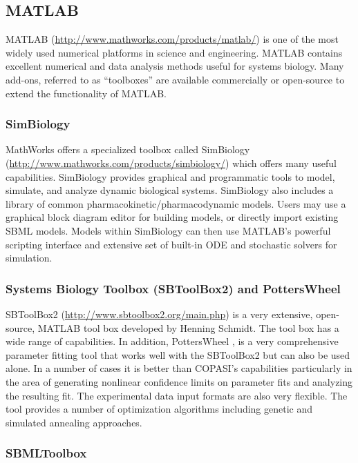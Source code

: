 \subsection{MATLAB}

MATLAB (\url{http://www.mathworks.com/products/matlab/}) is one of the
most widely used numerical platforms in science and engineering. MATLAB
contains excellent numerical and data analysis methods useful for
systems biology. Many add-ons, referred to as ``toolboxes'' are
available commercially or open-source to extend the functionality of
MATLAB.

\subsubsection{SimBiology}

MathWorks offers a specialized toolbox called SimBiology
(\url{http://www.mathworks.com/products/simbiology/}) which offers many
useful capabilities. SimBiology provides graphical and programmatic
tools to model, simulate, and analyze dynamic biological systems.
SimBiology also includes a library of common
pharmacokinetic/pharmacodynamic models. Users may use a graphical block
diagram editor for building models, or directly import existing SBML
models. Models within SimBiology can then use MATLAB's powerful
scripting interface and extensive set of built-in ODE and stochastic
solvers for simulation.

\subsubsection{Systems Biology Toolbox (SBToolBox2) and PottersWheel}

SBToolBox2 (\url{http://www.sbtoolbox2.org/main.php})
\autocite{schmidt2006systems} is a very extensive, open- source, MATLAB
tool box developed by Henning Schmidt. The tool box has a wide range of
capabilities. In addition, PottersWheel \autocite{maiwald2008dynamical},
is a very comprehensive parameter fitting tool that works well with the
SBToolBox2 but can also be used alone. In a number of cases it is better
than COPASI's capabilities particularly in the area of generating
nonlinear confidence limits on parameter fits and analyzing the
resulting fit. The experimental data input formats are also very
flexible. The tool provides a number of optimization algorithms
including genetic and simulated annealing approaches.

\subsubsection{SBMLToolbox}

